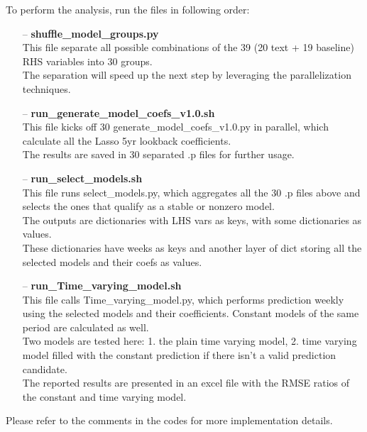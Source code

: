 \documentclass[11pt]{article}
\begin{document}
To perform the analysis, run the files in following order:
\begin{enumerate}
	\item[--] \textbf{shuffle\_model\_groups.py}\\
	 This file separate all possible combinations of the 39 (20 text + 19 baseline) RHS variables into 30 groups.\\
    The separation will speed up the next step by leveraging the parallelization techniques.
    \item[--] \textbf{run\_generate\_model\_coefs\_v1.0.sh}\\
    This file kicks off 30 generate\_model\_coefs\_v1.0.py in parallel, which calculate all the Lasso 5yr lookback coefficients.\\
    The results are saved in 30 separated .p files for further usage.
     \item[--] \textbf{run\_select\_models.sh}\\
         This file runs select\_models.py, which aggregates all the 30 .p files above and selects the ones that qualify as a stable or nonzero model.\\
    The outputs are dictionaries with LHS vars as keys, with some dictionaries as values. \\
    These dictionaries have weeks as keys and another layer of dict storing all the selected models and their coefs as values.
     \item[--] \textbf{run\_Time\_varying\_model.sh}\\
         This file calls Time\_varying\_model.py, which performs prediction weekly using the selected models and their coefficients. Constant models of the same period are calculated as well.\\
    Two models are tested here: 1. the plain time varying model, 2. time varying model filled with the constant prediction if there isn't a valid prediction candidate. \\
    The reported results are presented in an excel file with the RMSE ratios of the constant and time varying model.
\end{enumerate}

Please refer to the comments in the codes for more implementation details.
\end{document}
